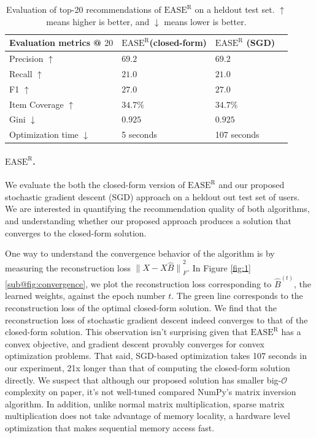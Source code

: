 \documentclass{article}
\newcommand{\easer}{$\text{EASE}^\text{R}$\xspace}
\newcommand{\norm}[1]{\ensuremath{\lVert #1 \rVert}}
\begin{document}
\begin{table}[h]
	\centering
	\begin{tabular}{@{}llll@{}}
		\toprule
		Evaluation metrics @ $20$     & \easer (closed-form) & \easer
		(SGD)
		\\ \midrule
		Precision $\uparrow$          & $69.2$               & $69.2$
		\\
		Recall	$\uparrow$              & $21.0$               &
		$21.0$
		\\
		F1	$\uparrow$                  & $27.0$               &
		$27.0$
		\\
		Item Coverage	$\uparrow$       & $34.7\%$             &
		$34.7\%$
		\\
		Gini	$\downarrow$              & $0.925$              &
		$0.925$
		\\
		Optimization time	$\downarrow$ & 5 seconds
		                              & 107 seconds
		\\ \bottomrule
	\end{tabular}
	\caption{Evaluation of top-20 recommendations of \easer on a heldout
		test set. $\uparrow$ means higher is better, and $\downarrow$
		means
		lower is better.}
	\label{tab:easer-results}

\end{table}

\paragraph*{\easer.}
We evaluate the both the closed-form version of \easer and our proposed
 stochastic gradient descent (SGD) approach on a heldout out test set of users.
We are interested in quantifying the recommendation quality of both algorithms,
 and understanding whether our proposed approach produces a solution that
 converges to the closed-form solution.

One way to understand the convergence behavior of the algorithm is by measuring
 the reconstruction loss $\norm{X - X \hat{B}}_F^2$.
In Figure \ref{fig:1}\ref{sub@fig:convergence}, we plot the reconstruction loss
 corresponding to $\hat{B}^{(t)}$, the learned weights, against the epoch number
 $t$.
The green line corresponds to the reconstruction loss of the optimal
 closed-form solution.
We find that the reconstruction loss of stochastic gradient descent indeed
 converges to that of the closed-form solution.
This observation isn't surprising given that \easer has a convex objective, and
 gradient descent provably converges for convex optimization problems.
That said, SGD-based optimization takes 107 seconds in our experiment, 21x
 longer than that of computing the closed-form solution directly.
We suspect that although our proposed solution has smaller big-$\mathcal{O}$
 complexity on paper, it's not well-tuned compared  NumPy's matrix inversion
 algorithm.
In addition, unlike normal matrix multiplication, sparse matrix multiplication
 does not take advantage of memory locality, a hardware level optimization that
 makes sequential memory access fast.
\end{document}
